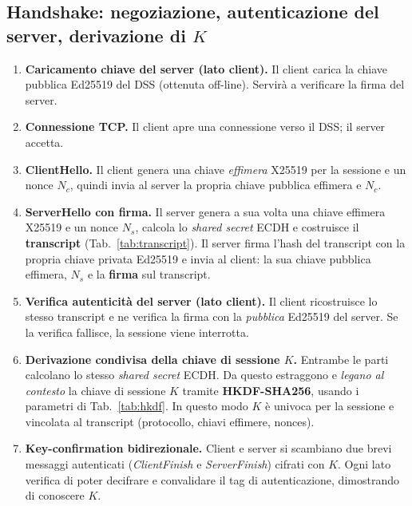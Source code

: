 \subsection{Handshake: negoziazione, autenticazione del server, derivazione di $K$}
\begin{enumerate}
  \item \textbf{Caricamento chiave del server (lato client).} Il client carica la chiave pubblica Ed25519 del DSS (ottenuta off-line). Servirà a verificare la firma del server.
  \item \textbf{Connessione TCP.} Il client apre una connessione verso il DSS; il server accetta.
  \item \textbf{ClientHello.} Il client genera una chiave \emph{effimera} X25519 per la sessione e un nonce $N_c$, quindi invia al server la propria chiave pubblica effimera e $N_c$.
  \item \textbf{ServerHello con firma.} Il server genera a sua volta una chiave effimera X25519 e un nonce $N_s$, calcola lo \emph{shared secret} ECDH e costruisce il \textbf{transcript} (Tab.~\ref{tab:transcript}). Il server firma l'hash del transcript con la propria chiave privata Ed25519 e invia al client: la sua chiave pubblica effimera, $N_s$ e la \textbf{firma} sul transcript.
  \item \textbf{Verifica autenticità del server (lato client).} Il client ricostruisce lo stesso transcript e ne verifica la firma con la \emph{pubblica} Ed25519 del server. Se la verifica fallisce, la sessione viene interrotta.
  \item \textbf{Derivazione condivisa della chiave di sessione $K$.} Entrambe le parti calcolano lo stesso \emph{shared secret} ECDH. Da questo estraggono e \emph{legano al contesto} la chiave di sessione $K$ tramite \textbf{HKDF-SHA256}, usando i parametri di Tab.~\ref{tab:hkdf}. In questo modo $K$ è univoca per la sessione e vincolata al transcript (protocollo, chiavi effimere, nonces).
  \item \textbf{Key-confirmation bidirezionale.} Client e server si scambiano due brevi messaggi autenticati (\emph{ClientFinish} e \emph{ServerFinish}) cifrati con $K$. Ogni lato verifica di poter decifrare e convalidare il tag di autenticazione, dimostrando di conoscere $K$.
\end{enumerate}


